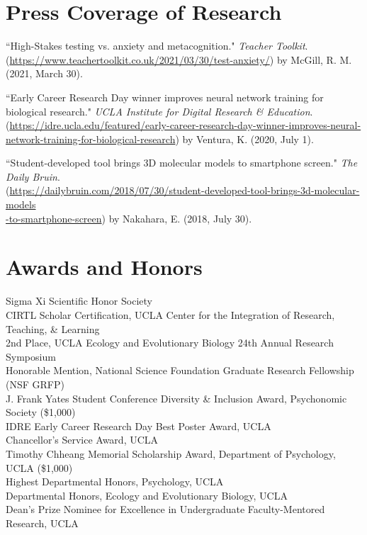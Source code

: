 \section*{Press Coverage of Research}
``High-Stakes testing vs. anxiety and metacognition." \textit{Teacher Toolkit}. \\ (\textcolor{RoyalBlue}{\href{https://www.teachertoolkit.co.uk/2021/03/30/test-anxiety/}{https://www.teachertoolkit.co.uk/2021/03/30/test-anxiety/}}) by McGill, R. M. (2021, March 30).

\pubspace

``Early Career Research Day winner improves neural network training for biological research." \textit{UCLA Institute for Digital Research \& Education}. (\textcolor{RoyalBlue}{\href{https://idre.ucla.edu/featured/early-career-research-day-winner-improves-neural-network-training-for-biological-research}{https://idre.ucla.edu/featured/early-career-research-day-winner-improves-neural-network-training-for-biological-research}}) by Ventura, K. (2020, July 1).

\pubspace

``Student-developed tool brings 3D molecular models to smartphone screen." \textit{The Daily Bruin}. \\ (\textcolor{RoyalBlue}{\href{https://dailybruin.com/2018/07/30/student-developed-tool-brings-3d-molecular-models-to-smartphone-screen}{https://dailybruin.com/2018/07/30/student-developed-tool-brings-3d-molecular-models \\ -to-smartphone-screen}}) by Nakahara, E. (2018, July 30).

\section*{Awards and Honors}
Sigma Xi Scientific Honor Society\\
CIRTL Scholar Certification, UCLA Center for the Integration of Research, Teaching, \& Learning\\
2nd Place, UCLA Ecology and Evolutionary Biology 24th Annual Research Symposium\\
Honorable Mention, National Science Foundation Graduate Research Fellowship (NSF GRFP)\\
J. Frank Yates Student Conference Diversity \& Inclusion Award, Psychonomic Society (\$1,000)\\
IDRE Early Career Research Day Best Poster Award, UCLA\\
Chancellor's Service Award, UCLA\\
Timothy Chheang Memorial Scholarship Award, Department of Psychology, UCLA (\$1,000)\\
Highest Departmental Honors, Psychology, UCLA\\
Departmental Honors, Ecology and Evolutionary Biology, UCLA\\
Dean's Prize Nominee for Excellence in Undergraduate Faculty-Mentored Research, UCLA
